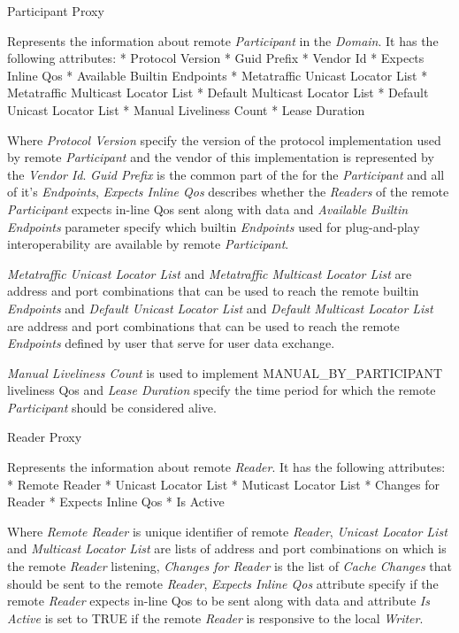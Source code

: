 \secc Participant Proxy

Represents the information about remote {\em Participant} in the {\em Domain}. It has the following attributes:
\begitems
* Protocol Version
* Guid Prefix
* Vendor Id
* Expects Inline Qos
* Available Builtin Endpoints
* Metatraffic Unicast Locator List
* Metatraffic Multicast Locator List
* Default Multicast Locator List
* Default Unicast Locator List
* Manual Liveliness Count
* Lease Duration
\enditems

Where {\em Protocol Version} specify the version of the  protocol implementation used by remote {\em Participant} and the vendor of this implementation is represented by the {\em Vendor Id}. {\em Guid Prefix} is the common part of the  for the {\em Participant} and all of it's {\em Endpoints}, {\em Expects Inline Qos} describes whether the {\em Readers} of the remote {\em Participant} expects in-line Qos sent along with data and {\em Available Builtin Endpoints} parameter specify which builtin {\em Endpoints} used for plug-and-play interoperability are available by remote {\em Participant}.

{\em Metatraffic Unicast Locator List} and {\em Metatraffic Multicast Locator List} are  address and port combinations that can be used to reach the remote builtin {\em Endpoints} and {\em Default Unicast Locator List} and {\em Default Multicast Locator List} are  address and port combinations that can be used to reach the remote {\em Endpoints} defined by user that serve for user data exchange.

{\em Manual Liveliness Count} is used to implement MANUAL\_BY\_PARTICIPANT liveliness Qos and {\em Lease Duration} specify the time period for which the remote {\em Participant} should be considered alive.

\secc Reader Proxy

Represents the information about remote {\em Reader}. It has the following attributes:
\begitems
* Remote Reader 
* Unicast Locator List
* Muticast Locator List
* Changes for Reader
* Expects Inline Qos
* Is Active
\enditems

Where {\em Remote Reader } is unique identifier of remote {\em Reader}, {\em Unicast Locator List} and {\em Multicast Locator List} are lists of  address and port combinations on which is the remote {\em Reader} listening, {\em Changes for Reader} is the list of {\em Cache Changes} that should be sent to the remote {\em Reader}, {\em Expects Inline Qos} attribute specify if the remote {\em Reader} expects in-line Qos to be sent along with data and attribute {\em Is Active} is set to TRUE if the remote {\em Reader} is responsive to the local {\em Writer}.

